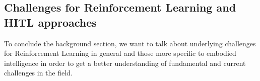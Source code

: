 \documentclass[twoside,11pt]{article}
\begin{document}




\subsection{Challenges for Reinforcement Learning and HITL approaches}

To conclude the background section, we want to talk about underlying challenges for Reinforcement Learning in general and those more specific to embodied intelligence in order to get a better understanding of fundamental and current challenges in the field.
\end{document}
